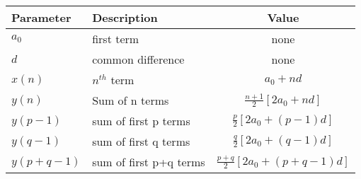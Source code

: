 \begin{tabular}{|l|l|c|}
\hline
\textbf{Parameter} & \textbf{Description} & \textbf{Value} \\
\hline
$a_0$ & first term & none \\
\hline
$d$ & common difference & none \\
\hline
$x(n)$ & $n^{th}$ term & $a_0+nd$ \\
\hline
$y(n)$ & Sum of n terms  & $\frac{n+1}{2}[2a_0+nd]$ \\
\hline
$y(p-1)$ & sum of first p terms & $\frac{p}{2}[2a_0+(p-1)d]$ \\
\hline
$y(q-1)$ & sum of first q terms & $\frac{q}{2}[2a_0+(q-1)d]$ \\
\hline
$y(p+q-1)$ & sum of first p+q terms & $\frac{p+q}{2}[2a_0+(p+q-1)d]$ \\
\hline
\end{tabular}

